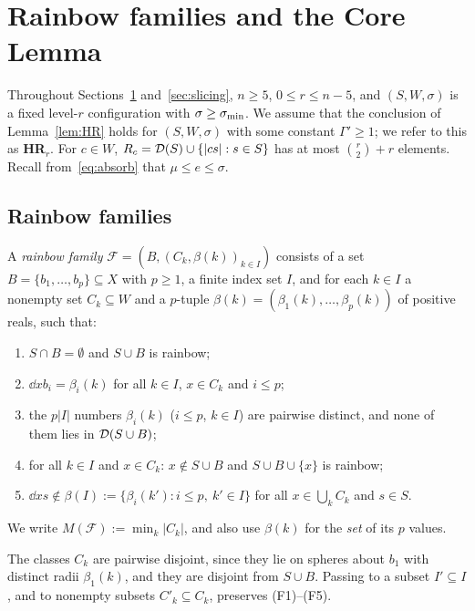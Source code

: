 \section{Rainbow families and the Core Lemma}\label{sec:core}

Throughout Sections~\ref{sec:core} and~\ref{sec:slicing}, $n\ge5$, $0\le r\le n-5$, and $(S,W,\sigma)$ is a fixed level-$r$
configuration with $\sigma\ge\sigma_{\min}$. We assume that the conclusion of Lemma~\ref{lem:HR} holds for $(S,W,\sigma)$
with some constant $\Gamma'\ge1$; we refer to this as \textbf{HR$_r$}. For $c\in W$, $R_c=\mathcal{D}(S)\cup\{|cs|:s\in S\}$
has at most $\binom r2+r$ elements. Recall from~\eqref{eq:absorb} that $\mu\le e\le\sigma$.

\subsection{Rainbow families}

\begin{definition}\label{def:family}
A \emph{rainbow family} $\mathcal F=(B,(C_k,\beta(k))_{k\in I})$ consists of a set $B=\{b_1,\dots,b_p\}\subseteq X$
with $p\ge1$, a finite index set $I$, and for each $k\in I$ a nonempty set $C_k\subseteq W$ and a $p$-tuple
$\beta(k)=(\beta_1(k),\dots,\beta_p(k))$ of positive reals, such that:
\begin{enumerate}[label=(F\arabic*)]
\item $S\cap B=\emptyset$ and $S\cup B$ is rainbow;
\item $\dd x{b_i}=\beta_i(k)$ for all $k\in I$, $x\in C_k$ and $i\le p$;
\item the $p|I|$ numbers $\beta_i(k)$ ($i\le p$, $k\in I$) are pairwise distinct, and none of them lies in
  $\mathcal{D}(S\cup B)$;
\item for all $k\in I$ and $x\in C_k$: $x\notin S\cup B$ and $S\cup B\cup\{x\}$ is rainbow;
\item $\dd xs\notin\beta(I):=\{\beta_i(k'):i\le p,\ k'\in I\}$ for all $x\in\bigcup_kC_k$ and $s\in S$.
\end{enumerate}
We write $M(\mathcal F):=\min_k|C_k|$, and also use $\beta(k)$ for the \emph{set} of its $p$ values.
\end{definition}

The classes $C_k$ are pairwise disjoint, since they lie on spheres about $b_1$ with distinct radii
$\beta_1(k)$, and they are disjoint from $S\cup B$. Passing to a subset $I'\subseteq I$, and to nonempty subsets
$C'_k\subseteq C_k$, preserves (F1)--(F5).

